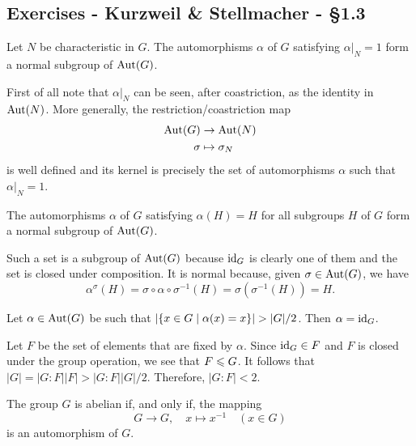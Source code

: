 \subsection{Exercises - Kurzweil \& Stellmacher - \S 1.3}

\begin{exr}
    Let\/ $N$ be characteristic in\/ $G$. The automorphisms\/ $\alpha$ of\/ $G$ satisfying\/ $\alpha|_N = 1$ form a normal subgroup of\/ ${\rm Aut}(G)$.
\end{exr}


\begin{solution} First of all note that $\alpha|_N$ can be seen, after coastriction, as the identity in ${\rm Aut}(N)$. More generally, the restriction/coastriction map
\begin{align*}
    {\rm Aut}(G)&\to{\rm Aut}(N)\\
    \sigma&\mapsto\sigma_N
\end{align*}
is well defined and its kernel is precisely the set of automorphisms $\alpha$ such that $\alpha|_N=1$.  \end{solution}

\begin{exr}
    The automorphisms\/ $\alpha$ of\/ $G$ satisfying\/ $\alpha(H) = H$ for all subgroups\/ $H$ of\/ $G$ form a normal subgroup of\/ ${\rm Aut}(G)$.
\end{exr}

\begin{solution} Such a set is a subgroup of ${\rm Aut}(G)$ because $\operatorname{id}_G$ is clearly one of them and the set is closed under composition. It is normal because, given $\sigma\in{\rm Aut}(G)$, we have
$$
    \alpha^\sigma(H)=\sigma\circ\alpha\circ\sigma^{-1}(H)
        =\sigma(\sigma^{-1}(H))=H.
$$
 \end{solution}

\begin{exr}
    Let\/ $\alpha \in {\rm Aut}(G)$ be such that\/ $|\{x \in G \mid \alpha(x) = x\}| > |G|/2$. Then\/ $\alpha = \operatorname{id}_G$.
\end{exr}

\begin{solution} Let $F$ be the set of elements that are fixed by $\alpha$. Since $\operatorname{id}_G\in F$ and $F$ is closed under the group operation, we see that $F\leqslant G$. It follows that $|G|=|G:F||F|>|G:F||G|/2$. Therefore, $|G:F|<2$.  \end{solution}

\begin{exr}
    The group\/ $G$ is abelian if, and only if, the mapping
    $$
        G \to G, \quad x \mapsto x^{-1} \quad (x \in G)
    $$
    is an automorphism of\/ $G$.
\end{exr}

